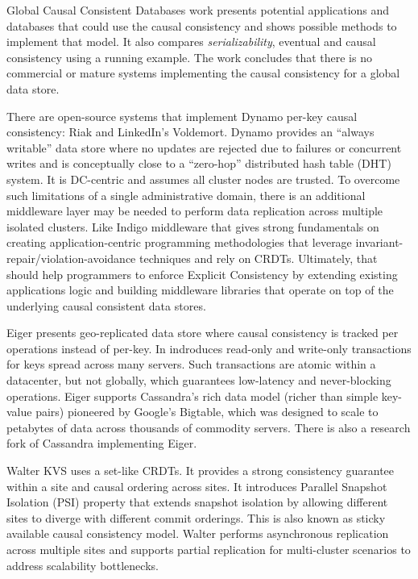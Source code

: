 \documentclass[conference]{IEEEtran}
\begin{document}
Global Causal Consistent Databases\cite{b6} work presents potential
applications and databases that could use the causal consistency and shows
possible methods to implement that model. It also compares
\textit{serializability}\cite{b4}, eventual and causal consistency using a
running example. The work concludes that there is no commercial or mature
systems implementing the causal consistency for a global data store.

There are open-source systems that implement Dynamo\cite{b17} per-key causal
consistency: Riak\cite{b19} and LinkedIn's Voldemort\cite{b20}. Dynamo
provides an ``always writable'' data store where no updates are rejected due
to failures or concurrent writes and is conceptually close to a ``zero-hop''
distributed hash table (DHT) system. It is DC-centric and assumes all cluster
nodes are trusted. To overcome such limitations of a single administrative
domain, there is an additional middleware layer may be needed to perform data
replication across multiple isolated clusters. Like Indigo middleware\cite{b10}
that gives strong fundamentals on creating application-centric programming
methodologies that leverage invariant-repair/violation-avoidance techniques and
rely on CRDTs. Ultimately, that should help programmers to enforce Explicit
Consistency by extending existing applications logic and building middleware
libraries that operate on top of the underlying causal consistent data stores.

Eiger\cite{b1} presents geo-replicated data store where causal consistency is
tracked per operations instead of per-key. In indroduces read-only and
write-only transactions for keys spread across many servers. Such transactions
are atomic within a datacenter, but not globally, which guarantees low-latency
and never-blocking operations. Eiger supports Cassandra's\cite{b25} rich data
model (richer than simple key-value pairs) pioneered by Google's Bigtable\cite{b26},
which was designed to scale to petabytes of data across thousands of commodity
servers. There is also a research fork of Cassandra implementing Eiger\cite{b23}.

Walter\cite{b11} KVS uses a set-like CRDTs. It provides a strong consistency
guarantee within a site and causal ordering across sites. It introduces
Parallel Snapshot Isolation (PSI) property that extends snapshot isolation by
allowing different sites to diverge with different commit orderings. This is
also known as sticky available causal consistency model. Walter performs
asynchronous replication across multiple sites and supports partial replication
for multi-cluster scenarios to address scalability bottlenecks.
\end{document}
